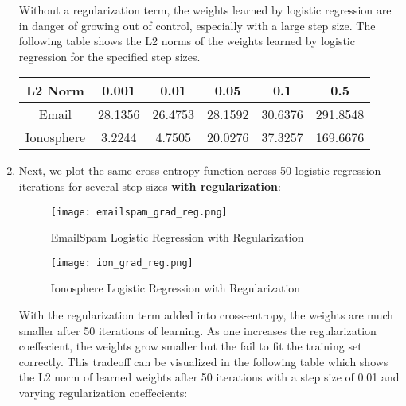 \documentclass[12pt]{article}
\begin{document}
\begin{enumerate}[label=\alph*.]
	Without a regularization term, the weights learned by logistic regression are in danger of growing out of control, especially with a large step size. The following table shows the L2 norms of the weights learned by logistic regression for the specified step sizes.

	\begin{center}
	\begin{tabular}{| c | c | c | c | c | c |} 
		\hline
	    	L2 Norm & 0.001 & 0.01 & 0.05 & 0.1 & 0.5 \\ 
		\hline \hline
		Email & 28.1356 & 26.4753 & 28.1592 & 30.6376 & 291.8548 \\
		\hline
		Ionosphere & 3.2244 & 4.7505 & 20.0276 & 37.3257 & 169.6676 \\	
		\hline
	    \end{tabular}
	\end{center}

	\item Next, we plot the same cross-entropy function across 50 logistic regression iterations for several step sizes \textbf{with regularization}:

	\begin{figure}[bp!]
	  \caption{EmailSpam Logistic Regression with Regularization}
	  \centering
	    \texttt{[image: emailspam\_grad\_reg.png]}
	\end{figure}

	\begin{figure}[bp!]
	  \caption{Ionosphere Logistic Regression with Regularization}
	  \centering
	    \texttt{[image: ion\_grad\_reg.png]}
	\end{figure}

	With the regularization term added into cross-entropy, the weights are much smaller after 50 iterations of learning. As one increases the regularization coeffecient, the weights grow smaller but the fail to fit the training set correctly. This tradeoff can be visualized in the following table which shows the L2 norm of learned weights after 50 iterations with a step size of 0.01 and varying regularization coeffecients:


\end{enumerate}
\end{document}
